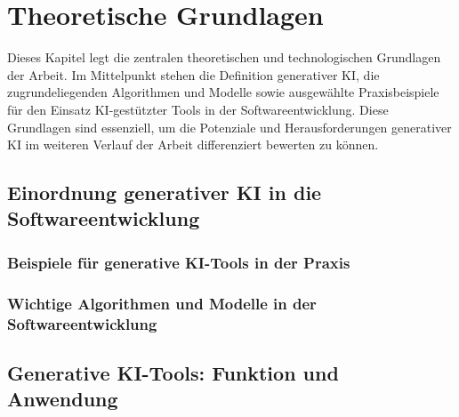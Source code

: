 \chapter{Theoretische Grundlagen}

Dieses Kapitel legt die zentralen theoretischen und technologischen Grundlagen
der Arbeit. Im Mittelpunkt stehen die Definition generativer KI, die
zugrundeliegenden Algorithmen und Modelle sowie ausgewählte Praxisbeispiele für
den Einsatz KI-gestützter Tools in der Softwareentwicklung. Diese Grundlagen
sind essenziell, um die Potenziale und Herausforderungen generativer KI im
weiteren Verlauf der Arbeit differenziert bewerten zu können.

\section{Einordnung generativer KI in die Softwareentwicklung}


\subsection{Beispiele für generative KI-Tools in der Praxis}


\subsection{Wichtige Algorithmen und Modelle in der Softwareentwicklung}


\section{Generative KI-Tools: Funktion und Anwendung}


